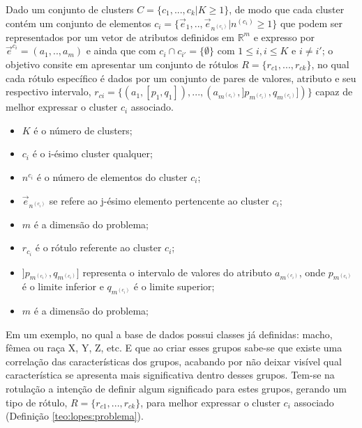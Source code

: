     \begin{teorema}
    Dado um conjunto de clusters ${C=\{c_1,...,c_k | K \geqslant 1\} }$, de modo que cada cluster contém um conjunto de elementos ${c_i=\{\vec{e}_1,..,\vec{e}_{n^{(c_i)}}|n^{(c_i)} \geqslant 1 \}}$ que podem ser representados por um vetor de atributos definidos em ${\mathbb{R}^m }$ e expresso por ${ \vec{e}^{c_i}=(a_1,..,a_m)  }$ e ainda que  com ${ c_i \cap c_{i'}=\{\emptyset\} }$ com ${ 1 \leqslant i, i \leqslant K  }$ e ${ i \neq i' }$; o objetivo consite em apresentar um conjunto de rótulos ${ R=\{ r_{c1},...,r_{ck} \} }$, no qual cada rótulo específico é dados por um conjunto de pares de valores, atributo e seu respectivo intervalo, ${ r_{ci}=\{ (a_1,[p_1,q_1]),...,(a_{m^{(c_i)}}, ]p_{m^{(c_i)}},q_{m^{(c_i)}}]) \} }$ capaz de melhor expressar o cluster ${c_i}$ associado.
        \begin{itemize}[noitemsep]
            \item ${K}$ é o número de clusters;
            \item ${c_i}$ é o i-ésimo cluster qualquer;
            \item ${n^{c_i}}$ é o número de elementos do cluster ${c_i}$;
            \item ${\vec{e}_{n^{(c_i)}}}$ se refere ao j-ésimo elemento pertencente ao cluster ${c_i}$;
            \item ${m}$ é a dimensão do problema;
            \item ${r_{c_i}}$ é o rótulo referente ao cluster ${c_i}$;
            \item ${]p_{m^{(c_i)}},q_{m^{(c_i)}}]}$ representa o intervalo de valores do atributo ${a_{m^{(c_i)}} }$, onde ${ p_{m^{(c_i)}} }$  é o limite inferior e ${ q_{m^{(c_i)}} }$ é o limite superior;
            \item ${m}$ é a dimensão do problema;
        \end{itemize}
    \label{teo:lopes:problema}
    \end{teorema}

Em um exemplo, no qual a base de dados possui classes já definidas: macho, fêmea ou raça X, Y, Z, etc. E que ao criar esses grupos sabe-se que existe uma correlação das características dos grupos, acabando por não deixar visível qual característica se apresenta mais significativa dentro desses grupos. Tem-se na rotulação a intenção de definir algum significado para estes grupos, gerando um tipo de rótulo, ${ R=\{ r_{c1},...,r_{ck} \} }$, para melhor expressar o cluster ${c_i}$ associado (Definição \ref{teo:lopes:problema}).

